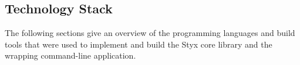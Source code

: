 \subsection{Technology Stack}

The following sections give an overview of the programming languages and build tools that were used to implement and build the Styx core library and the wrapping command-line application.



